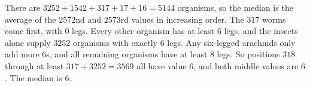 There are $3252+1542+317+17+16=5144$ organisms, so the median is the average of the $2572$nd and $2573$rd values in increasing order. The $317$ worms come first, with $0$ legs. Every other organism has at least $6$ legs, and the insects alone supply $3252$ organisms with exactly $6$ legs. Any six-legged arachnids only add more $6$s, and all remaining organisms have at least $8$ legs. So positions $318$ through at least $317+3252=3569$ all have value $6$, and both middle values are $6$. The median is $\boxed{6}$.
